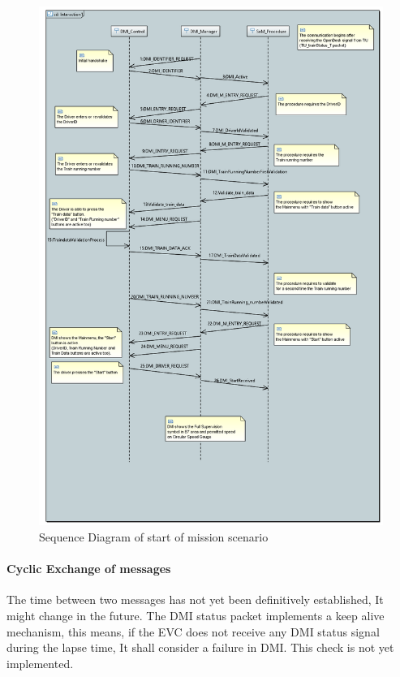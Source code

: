   \begin{figure}
  \centering
  \includegraphics[scale=0.45]{images/SeqDia_DMIctr_DMImng_SoMproc}
  \caption{Sequence Diagram of start of mission scenario}\label{fig:SeqDiaSoM}
  \end{figure}
  

\paragraph{ Cyclic Exchange of messages}
The time between two messages has not yet been definitively established, It might change in the future. The DMI status packet implements a keep alive mechanism, this means, if the EVC does not receive any DMI status signal during the lapse time, It shall consider a failure in DMI. This check is not yet implemented.

